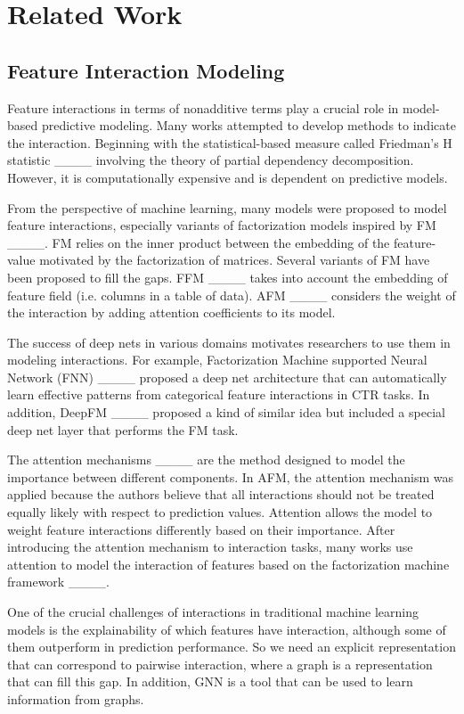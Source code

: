 \section{Related Work}
\label{sec:related}

\subsection{Feature Interaction Modeling}

Feature interactions in terms of nonadditive terms play a crucial role in model-based predictive modeling.
Many works attempted to develop methods to indicate the interaction.
Beginning with the statistical-based measure called Friedman's H statistic ____ involving the theory of partial dependency decomposition.
However, it is computationally expensive and is dependent on predictive models.

From the perspective of machine learning, many models were proposed to model feature interactions, especially variants of factorization models inspired by FM ____.
FM relies on the inner product between the embedding of the feature-value motivated by the factorization of matrices.
Several variants of FM have been proposed to fill the gaps.
FFM ____ takes into account the embedding of feature field (i.e. columns in a table of data).
AFM ____ considers the weight of the interaction by adding attention coefficients to its model.

The success of deep nets in various domains motivates researchers to use them in modeling interactions.
For example, Factorization Machine supported Neural Network (FNN) ____ proposed a deep net architecture that can automatically learn effective patterns from categorical feature interactions in CTR tasks.
In addition, DeepFM ____ proposed a kind of similar idea but included a special deep net layer that performs the FM task.

The attention mechanisms ____ are the method designed to model the importance between different components.
In AFM, the attention mechanism was applied because the authors believe that all interactions should not be treated equally likely with respect to prediction values.
Attention allows the model to weight feature interactions differently based on their importance.
After introducing the attention mechanism to interaction tasks, many works use attention to model the interaction of features based on the factorization machine framework ____.

One of the crucial challenges of interactions in traditional machine learning models is the explainability of which features have interaction, although some of them outperform in prediction performance.
So we need an explicit representation that can correspond to pairwise interaction, where a graph is a representation that can fill this gap.
In addition, GNN is a tool that can be used to learn information from graphs.


